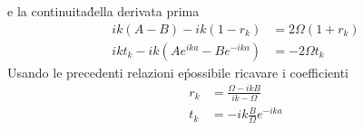 \documentclass[a4paper]{article}
\begin{document}
        e la continuita\' della derivata prima
        \begin{equation*}
            \begin{split}
                ik(A-B)-ik(1-r_k)&=2\Omega(1+r_k)\\
                ikt_k-ik(Ae^{ika}-Be^{-ika})&=-2\Omega t_k
            \end{split}
        \end{equation*}
        Usando le precedenti relazioni e\' possibile ricavare i coefficienti
        \begin{equation*}
            \begin{split}
                r_k&=\frac{\Omega-ikB}{ik-\Omega}\\
                t_k&=-ik\frac{B}{\Omega}e^{-ika}
            \end{split}
        \end{equation*}
        \begin{center}
        \end{center}
\end{document}
